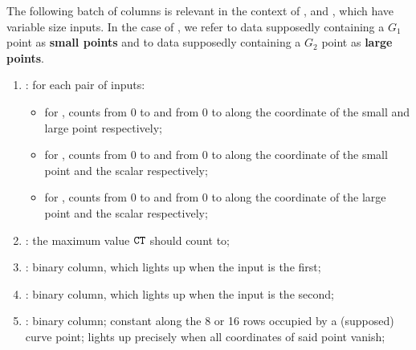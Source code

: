 The following batch of columns is relevant in the context of ,  and , which have variable size inputs.
In the case of , we refer to data supposedly containing a $G_1$ point as \textbf{small points} and to data supposedly containing a $G_2$ point as \textbf{large points}.
\begin{enumerate}[resume]
      \item \ct:
            for each pair of inputs:
            \begin{itemize}
                  \item for , counts from 0 to \ctMaxSmallPoint{} and from 0 to \ctMaxLargePoint{} along the coordinate of the small and large point respectively;
                  \item for , counts from 0 to \ctMaxSmallPoint{} and from 0 to \ctMaxScalar{} along the coordinate of the small point and the scalar respectively;
                  \item for , counts from 0 to \ctMaxLargePoint{} and from 0 to \ctMaxScalar{} along the coordinate of the large point and the scalar respectively;
            \end{itemize}
      \item \maxCt:
            the maximum value $\texttt{CT}$ should count to;
      \item \isFirstInput:
            binary column, which lights up when the input is the first;
      \item \isSecondInput:
            binary column, which lights up when the input is the second;
      \item \isInfinity:
            binary column;
            constant along the 8 or 16 rows occupied by a (supposed) curve point;
            lights up precisely when all coordinates of said point vanish;


\end{enumerate}
